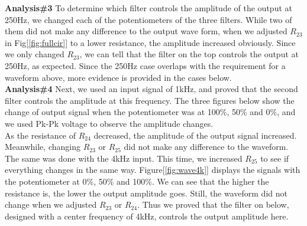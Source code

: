 \textbf{Analysis\#3} \newline
\phantom{ } To determine which filter controls the amplitude of the output at 250Hz, we changed each of the potentiometers of the three filters. While two of them did not make any difference to the output wave form, when we adjusted $R_{23}$ in Fig[\ref{fig:fullcir}] to a lower resistance, the amplitude increased obviously. Since we only changed $R_{23}$, we can tell that the filter on the top controls the output at 250Hz, as expected. Since the 250Hz case overlaps with the requirement for a waveform above, more evidence is provided in the cases below.\\

\textbf{Analysis\#4} \newline
\phantom{ } Next, we used an input signal of 1kHz, and proved that the second filter controls the amplitude at this frequency. The three figures below show the change of output signal when the potentiometer was at 100\%, 50\% and 0\%, and we used Pk-Pk voltage to observe the amplitude changes. \\
\phantom{ } As the resistance of $R_{24}$ decreased, the amplitude of the output signal increased. Meanwhile, changing $R_{23}$ or $R_{25}$ did not make any difference to the waveform.\\
\newline
\phantom{ } The same was done with the 4kHz input. This time, we increased $R_{25}$ to see if everything changes in the same way. Figure[\ref{fig:wave4k}] displays the signals with the potentiometer at 0\%, 50\% and 100\%. We can see that the higher the resistance is, the lower the output amplitude goes. Still, the waveform did not change when we adjusted $R_{23}$ or $R_{24}$. Thus we proved that the filter on below, designed with a center frequency of 4kHz, controls the output amplitude here.

